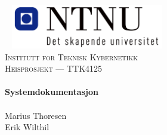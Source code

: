 \begin{titlepage}
\begin{center}
~
\vspace{3cm}
\includegraphics[width=0.5\textwidth]{grafikk/NTNU.png}\\[2cm]
\textsc{\Large Institutt for Teknisk Kybernetikk}\\[0.5cm]

\textsc{\large Heisprosjekt --- TTK4125}\\[0.5cm]
\HRule \\[0.4cm]
{ \huge \bfseries Systemdokumentasjon}\\[0.4cm]

\HRule \\[1.5cm]

Marius Thoresen\\
Erik Wilthil
\end{center}
\end{titlepage}
